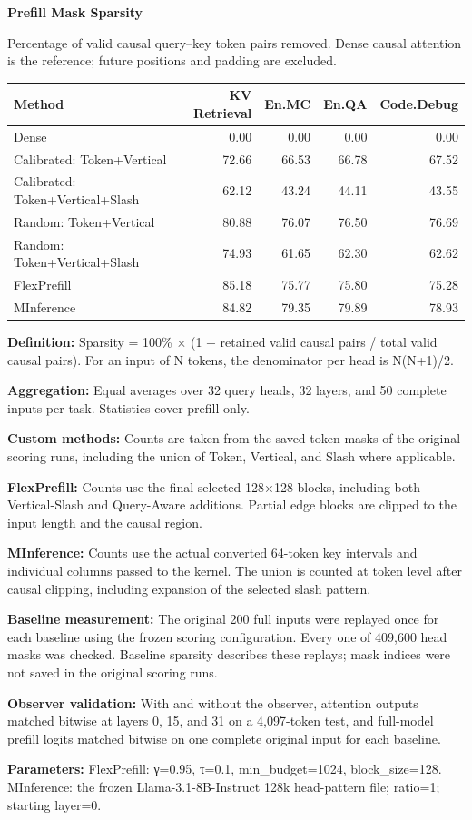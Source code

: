 \documentclass[11pt,a4paper]{article}
\begin{document}
\newpage
\begin{center}
{\Large\bfseries Prefill Mask Sparsity}
\end{center}

Percentage of valid causal query--key token pairs removed. Dense causal
attention is the reference; future positions and padding are excluded.

\begingroup
\setlength{\tabcolsep}{5pt}
\begin{tabularx}{\textwidth}{@{}Xrrrr@{}}
\toprule
\textbf{Method} & \textbf{KV Retrieval} & \textbf{En.MC} & \textbf{En.QA} & \textbf{Code.Debug} \\
\midrule
Dense & 0.00 & 0.00 & 0.00 & 0.00 \\
Calibrated: Token+Vertical & 72.66 & 66.53 & 66.78 & 67.52 \\
Calibrated: Token+Vertical+Slash & 62.12 & 43.24 & 44.11 & 43.55 \\
Random: Token+Vertical & 80.88 & 76.07 & 76.50 & 76.69 \\
Random: Token+Vertical+Slash & 74.93 & 61.65 & 62.30 & 62.62 \\
FlexPrefill & 85.18 & 75.77 & 75.80 & 75.28 \\
MInference & 84.82 & 79.35 & 79.89 & 78.93 \\
\bottomrule
\end{tabularx}
\endgroup

\vspace{6pt}
\textbf{Definition:} Sparsity = 100\% ×
(1 − retained valid causal pairs / total valid causal pairs).
For an input of N tokens, the denominator per head is N(N+1)/2.

\textbf{Aggregation:} Equal averages over 32 query heads, 32 layers,
and 50 complete inputs per task. Statistics cover prefill only.

\textbf{Custom methods:} Counts are taken from the saved token masks of
the original scoring runs, including the union of Token, Vertical, and Slash
where applicable.

\textbf{FlexPrefill:} Counts use the final selected 128×128 blocks,
including both Vertical-Slash and Query-Aware additions. Partial edge blocks
are clipped to the input length and the causal region.

\textbf{MInference:} Counts use the actual converted 64-token key intervals
and individual columns passed to the kernel. The union is counted at token
level after causal clipping, including expansion of the selected slash pattern.

\textbf{Baseline measurement:} The original 200 full inputs were replayed
once for each baseline using the frozen scoring configuration. Every one of
409,600 head masks was checked. Baseline sparsity describes these replays;
mask indices were not saved in the original scoring runs.

\textbf{Observer validation:} With and without the observer, attention
outputs matched bitwise at layers 0, 15, and 31 on a 4,097-token test, and
full-model prefill logits matched bitwise on one complete original input
for each baseline.

\textbf{Parameters:} FlexPrefill: γ=0.95, τ=0.1,
min\_budget=1024, block\_size=128. MInference: the frozen
Llama-3.1-8B-Instruct 128k head-pattern file; ratio=1; starting layer=0.
\end{document}
